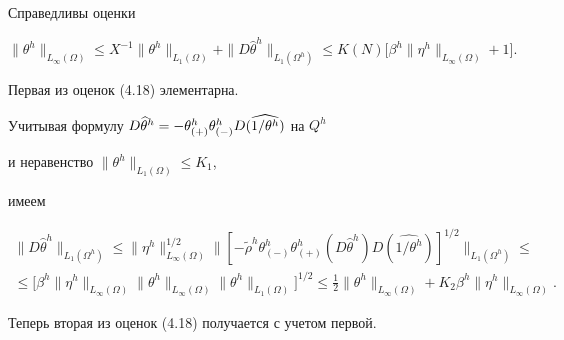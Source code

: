 \documentclass[12pt]{article}
\theoremstyle{plain} %
\newtheorem{lemm}{\hskip\parindent Лемма}[section]
\theoremstyle{definition}
\numberwithin{equation}{section}
\begin{document}
\begin{lemm} Справедливы оценки


\begin{equation}


\|\theta^h\|_{L_\infty(\Omega)}\le


X^{-1}\|\theta^h\|_{L_1(\Omega)}+


\|D\widehat\theta^h\|_{L_1(\Omega^h)}\le


K(N)\bigl[\beta^h\|\eta^h\|_{L_\infty(\Omega)}+1\bigr].


\end{equation}


\end{lemm}





\begin{pf} Первая из оценок (4.18) элементарна.


Учитывая формулу $D\widehat\theta^h =\linebreak


-\theta^h_{(+)}\theta^h_{(-)}D(\widehat{1/{\theta^h}})$ на $Q^h$


и неравенство $\|\theta^h\|_{L_1(\Omega)}\le K_1$,


имеем


\begin{multline*}


\|D\widehat\theta^h\|_{L_1(\Omega^h)}\le


\|\eta^h\|_{L_\infty(\Omega)}^{1/2}


\bigl\|[-\widetilde\rho^h \theta_{(-)}^h\theta_{(+)}^h


(D\widehat\theta^h) D(\widehat{1/{\theta^h}})


]^{1/2}\bigr\|_{L_1(\Omega^h)}\le\\


\le \bigl[\beta^h\|\eta^h\|_{L_\infty(\Omega)}


\|\theta^h\|_{L_\infty(\Omega)}\|\theta^h\|_{L_1(\Omega)}\bigr]^{1/2}


\le \frac{1}{2}\|\theta^h\|_{L_\infty(\Omega)}


+ K_2\beta^h\|\eta^h\|_{L_\infty(\Omega)}.


\end{multline*}


Теперь вторая из оценок (4.18) получается с учетом первой.


\end{pf}
\end{document}
